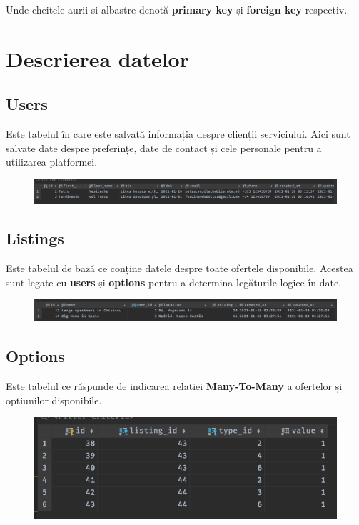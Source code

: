 \documentclass[12pt. a4paper]{report}
\begin{document}
Unde cheitele aurii si albastre denotă \textbf{primary key} și \textbf{foreign key} respectiv.

\section{Descrierea datelor}

\subsection{Users}
Este tabelul în care este salvată informația despre clienții serviciului. Aici sunt salvate date despre preferințe, date de contact și cele personale pentru a utilizarea platformei.

\begin{figure}[H]
\center
\includegraphics[width=\textwidth]{users_table}
\end{figure}

\subsection{Listings}
Este tabelul de bază ce conține datele despre toate ofertele disponibile. Acestea sunt legate cu \textbf{users} și \textbf{options} pentru a determina legăturile logice în date.

\begin{figure}[H]
\center
\includegraphics[width=\textwidth]{listings_table}
\end{figure}

\subsection{Options}
Este tabelul ce răspunde de indicarea relației \textbf{Many-To-Many} a ofertelor și optiunilor disponibile.

\begin{figure}[H]
\center
\includegraphics[width=\textwidth]{options_table}
\end{figure}
\end{document}

